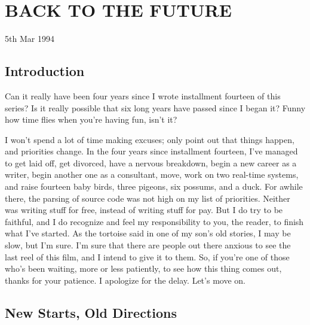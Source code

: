 
\chapter {BACK TO THE FUTURE}

5th Mar 1994

\section{Introduction}

Can it really have been four years since I wrote installment fourteen of this series?  Is it really possible that six long years have passed since I began it?  Funny how time flies when you're having fun, isn't it?

I won't spend a lot of time making excuses; only point out that things happen, and priorities change. In the four years since installment fourteen, I've managed to get laid off, get divorced, have a nervous breakdown, begin a new career as a writer, begin another one as a consultant, move, work on two real-time systems, and raise fourteen baby birds, three pigeons, six possums, and a duck. For awhile there, the parsing of source code was not high on my list of priorities. Neither was writing stuff for free, instead of writing stuff for pay. But I do try to be faithful, and I do recognize and feel my responsibility to you, the reader, to finish what I've started. As the tortoise said in one of my son's old stories, I may be slow, but I'm sure. I'm  sure that there are people out there anxious to see the last reel of this film, and I intend to give it to them. So, if you're one of those who's been waiting, more or less patiently, to see how this thing comes out, thanks for your patience. I apologize for the delay. Let's move on.

\section{New Starts, Old Directions}

